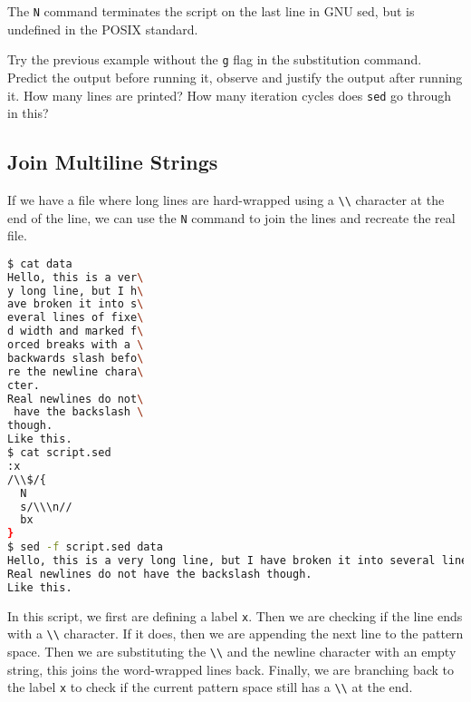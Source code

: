 \begin{remark}
  The \lstinline|N| command terminates the script on the last line in GNU sed, but is undefined in the POSIX standard.
\end{remark}

\begin{exercise}
  Try the previous example without the \lstinline|g| flag in the substitution command. Predict the output before running it, observe and justify the output after running it.
  How many lines are printed?
  How many iteration cycles does \lstinline|sed| go through in this?
\end{exercise}

\subsection{Join Multiline Strings}

If we have a file where long lines are hard-wrapped using a \lstinline|\\| character at the end of the line, we can use the \lstinline|N| command to join the lines and recreate the real file.

\begin{lstlisting}[language=bash]
$ cat data
Hello, this is a ver\
y long line, but I h\
ave broken it into s\
everal lines of fixe\
d width and marked f\
orced breaks with a \
backwards slash befo\
re the newline chara\
cter.
Real newlines do not\
 have the backslash \
though.
Like this.
$ cat script.sed
:x
/\\$/{
  N
  s/\\\n//
  bx
}
$ sed -f script.sed data
Hello, this is a very long line, but I have broken it into several lines of fixed width and marked forced breaks with a backwards slash before the newline character.
Real newlines do not have the backslash though.
Like this.
\end{lstlisting}

In this script, we first are defining a label \lstinline|x|.
Then we are checking if the line ends with a \lstinline|\\| character.
If it does, then we are appending the next line to the pattern space.
Then we are substituting the \lstinline|\\| and the newline character with an empty string, this joins the word-wrapped lines back.
Finally, we are branching back to the label \lstinline|x| to check if the current pattern space still has a \lstinline|\\| at the end.

